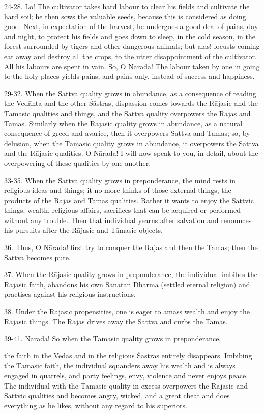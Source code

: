 24-28. Lo! The cultivator takes hard labour to clear his fields and cultivate the hard soil; he then sows the valuable seeds, because this is considered as doing good. Next, in expectation of the harvest, he undergoes a good deal of pains, day and night, to protect his fields and goes down to sleep, in the cold season, in the forest surrounded by tigers and other dangerous animals; but alas! locusts coming eat away and destroy all the crops, to the utter disappointment of the cultivator. All his labours are spent in vain. So, O N\=arada! The labour taken by one in going to the holy places yields pains, and pains only, instead of success and happiness.

29-32. When the Sattva quality grows in abundance, as a consequence of reading the Ved\=anta and the other \'S\=astras, dispassion comes towards the R\=ajasic and the T\=amasic qualities and things, and the Sattva quality overpowers the Rajas and Tamas. Similarly when the R\=ajasic quality grows in abundance, as a natural consequence of greed and avarice, then it overpowers Sattva and Tamas; so, by delusion, when the T\=amasic quality grows in abundance, it overpowers the Sattva and the R\=ajasic qualities. O N\=arada! I will now speak to you, in detail, about the overpowering of these qualities by one another.

33-35. When the Sattva quality grows in preponderance, the mind rests in religious ideas and things; it no more thinks of those external things, the products of the Rajas and Tamas qualities. Rather it wants to enjoy the S\=attvic things; wealth, religious affairs, sacrifices that can be acquired or performed without any trouble. Then that individual yearns after salvation and renounces his pursuits after the R\=ajasic and T\=amasic objects.

36. Thus, O N\=arada! first try to conquer the Rajas and then the Tamas; then the Sattva becomes pure.

37. When the R\=ajasic quality grows in preponderance, the individual imbibes the R\=ajasic faith, abandons his own San\=atan Dharma (settled eternal religion) and practises against his religious instructions.

38. Under the R\=ajasic propensities, one is eager to amass wealth and enjoy the R\=ajasic things. The Rajas drives away the Sattva and curbs the Tamas.

39-41. N\=arada! So when the T\=amasic quality grows in preponderance,

the faith in the Vedas and in the religious \'S\=astras entirely disappears. Imbibing the T\=amasic faith, the individual squanders away his wealth and is always engaged in quarrels, and party feelings, envy, violence and never enjoys peace. The individual with the T\=amasic quality in excess overpowers the R\=ajasic and S\=attvic qualities and becomes angry, wicked, and a great cheat and does everything as he likes, without any regard to his superiors.


